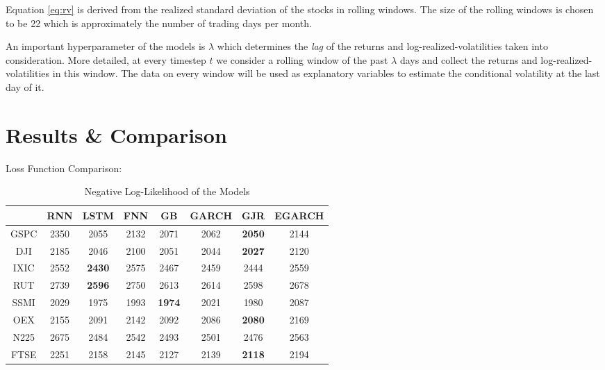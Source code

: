 \documentclass[a4paper, oneside]{discothesis}
\begin{document}
\begin{remark}
Equation \ref{eq:rv} is derived from the realized standard deviation of the stocks in rolling windows. The size of the rolling windows is chosen to be 22 which is approximately the number of trading days per month.
\end{remark}

\begin{remark}\label{ref: lag}
An important hyperparameter of the models is $\lambda$ which determines the \textit{lag} of the returns and log-realized-volatilities taken into consideration. More detailed, at every timestep $t$ we consider a rolling window of the past $\lambda$ days and collect the returns and log-realized-volatilities in this window. The data on every window will be used as explanatory variables to estimate the conditional volatility at the last day of it. 
\end{remark}

\section{Results \& Comparison}


 Loss Function Comparison:
 
\begin{table}[!hbt]
\centering
\begin{tabular}{ |c|||c|c|c|c||c|c|c| } 
\hline
 & RNN&LSTM&FNN&GB&GARCH&GJR&EGARCH \\
 \hline
GSPC & 2350&2055&2132&2071&2062&\textbf{2050}&2144 \\ 
DJI & 2185&2046&2100&2051&2044&\textbf{2027}&2120\\
IXIC&2552&\textbf{2430}&2575&2467&2459&2444&2559\\
RUT&2739&\textbf{2596}&2750&2613&2614&2598&2678\\
SSMI&2029&	1975&	1993&	\textbf{1974}&	2021&	1980&	2087\\
OEX&	2155&	2091&	2142&	2092&	2086&	\textbf{2080}&	2169\\
N225&	2675&	2484&	2542&	2493&	2501&	2476&	2563\\
FTSE&	2251&	2158&	2145&	2127&	2139&	\textbf{2118}&	2194\\
\hline
\end{tabular}
\caption{Negative Log-Likelihood of the Models}
\end{table}
\end{document}

